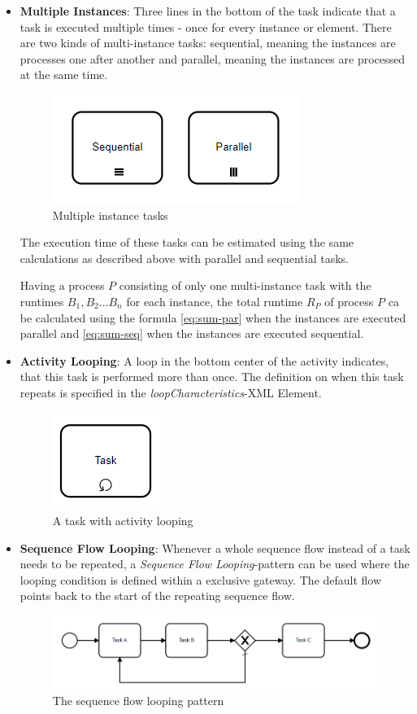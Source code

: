 \begin{itemize}
	
	\item \textbf{Multiple Instances}: Three lines in the bottom of the task indicate that a task is executed multiple times - once for every instance or element. There are two kinds of multi-instance tasks: sequential, meaning the instances are processes one after another and parallel, meaning the instances are processed at the same time. 
	\begin{figure}[H]
		\centering
		\includegraphics[width=0.4\columnwidth]{graphics/multi-instance-tasks}
		\caption{Multiple instance tasks} 
		\label{fig:muliti-instance-tasks} 
	\end{figure}
	The execution time of these tasks can be estimated using the same calculations as described above with parallel and sequential tasks.
	
	Having a process $P$ consisting of only one multi-instance task with the runtimes $B_1,B_2 ... B_n$ for each instance, the total runtime $R_P$ of process $P$ ca be calculated using the formula \ref{eq:sum-par} when the instances are executed parallel and \ref{eq:sum-seq} when the instances are executed sequential. 
	
	\item \textbf{Activity Looping}: A loop in the bottom center of the activity indicates, that this task is performed more than once. The definition on when this task repeats is specified in the \textit{loopCharacteristics}-XML Element.
	\begin{figure}[H]
		\centering
		\includegraphics[width=0.2\columnwidth]{graphics/looped-task}
		\caption{A task with activity looping} 
		\label{fig:activity-looping} 
	\end{figure}
	\item \textbf{Sequence Flow Looping}: Whenever a whole sequence flow instead of a task needs to be repeated, a \textit{Sequence Flow Looping}-pattern can be used where the looping condition is defined within a exclusive gateway. The default flow points back to the start of the repeating sequence flow. 
	\begin{figure}[H]
		\centering
		\includegraphics[width=0.9\columnwidth]{graphics/sequence-flow-looping}
		\caption{The sequence flow looping pattern} 
		\label{fig:sequence-flow-looping} 
	\end{figure}
	

\end{itemize}
